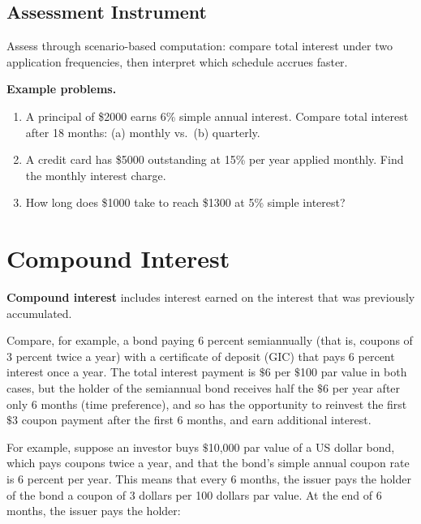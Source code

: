 \subsection{Assessment Instrument}
\label{ssec:asse-3669}


Assess through scenario-based computation: compare total interest under
two application frequencies, then interpret which schedule accrues faster.

\textbf{Example problems.}
\begin{enumerate}
    \item A principal of \$2000 earns 6\% simple annual interest. Compare
          total interest after 18 months: (a) monthly vs.\ (b) quarterly.
    \item A credit card has \$5000 outstanding at 15\% per year applied
          monthly. Find the monthly interest charge.
    \item How long does \$1000 take to reach \$1300 at 5\% simple interest?
\end{enumerate}



\section{Compound Interest}
\label{sec:comp-6150}


\textbf{Compound interest} includes interest earned on the interest that was previously accumulated.



Compare, for example, a bond paying 6 percent semiannually (that is, coupons of 3 percent
twice a year) with a certificate of deposit (GIC) that pays 6 percent interest once a
year. The total interest payment is $\text{\$}$6 per $\text{\$}$100 par value in both
cases, but the holder of the semiannual bond receives half the $\text{\$}$6 per year after
only 6 months (time preference), and so has the opportunity to reinvest the first
$\text{\$}$3 coupon payment after the first 6 months, and earn additional interest.



For example, suppose an investor buys $\text{\$}$10,000 par value of a US dollar bond,
which pays coupons twice a year, and that the bond's simple annual coupon rate is 6
percent per year. This means that every 6 months, the issuer pays the holder of the bond a
coupon of 3 dollars per 100 dollars par value. At the end of 6 months, the issuer pays the
holder:



